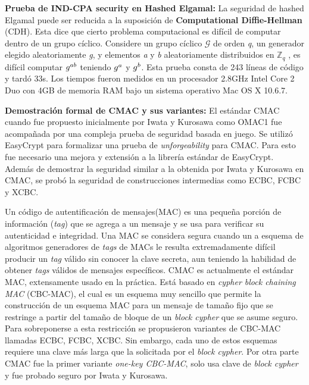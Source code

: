 \documentclass[runningheads]{llncs}
\begin{document}
\textbf{Prueba de \textbf{IND-CPA security} en Hashed Elgamal\cite{ref_article5}:}
La seguridad de hashed Elgamal puede ser reducida a la suposición de \textbf{Computational Diffie-Hellman} (CDH). Esta dice que cierto problema computacional es difícil de computar dentro de un grupo cíclico. Considere un grupo cíclico $\mathcal{G}$ de orden \textit{q}, un generador elegido aleatoriamente \textit{g}, y elementos \textit{a} y \textit{b} aleatoriamente distribuidos en $\mathbb{Z}_q$ , es difícil computar $\mathnormal{g^{ab}}$ teniendo $\mathnormal{g^{a}}$ y $\mathnormal{g^{b}}$. Esta prueba consta de 243 líneas de código y tardó 33s. Los tiempos fueron medidos en un procesador 2.8GHz Intel Core 2 Duo con 4GB de memoria RAM bajo un sistema operativo Mac OS X 10.6.7.



\textbf{Demostración formal de CMAC y sus variantes\cite{ref_article6}:}
El estándar CMAC cuando fue propuesto inicialmente por Iwata y Kurosawa como OMAC1 fue acompañada por una compleja prueba de seguridad basada en juego. Se utilizó EasyCrypt para formalizar una prueba de \textit{unforgeability} para CMAC. Para esto fue necesario una mejora y extensión a la librería estándar de EasyCrypt. Además de demostrar la seguridad similar a la obtenida por Iwata y Kurosawa\cite{ref_article7} en CMAC, se probó la seguridad de construcciones intermedias como ECBC, FCBC y XCBC\cite{ref_article8}.

Un código de autentificación de mensajes(MAC) es una pequeña porción de información (\textit{tag}) que se agrega a un mensaje y se usa para verificar su autenticidad e integridad. Una MAC se considera segura cuando un a esquema de algoritmos generadores de \textit{tags} de MACs le resulta extremadamente difícil producir un \textit{tag} válido sin conocer la clave secreta, aun teniendo la habilidad de obtener \textit{tags} válidos de mensajes específicos. CMAC es actualmente el estándar MAC, extensamente usado en la práctica. Está basado en \textit{cypher block chaining MAC} (CBC-MAC), el cual es un esquema muy sencillo que permite la construcción de un esquema MAC para un mensaje de tamaño fijo que se restringe a partir del tamaño de bloque de un \textit{block cypher} que se asume seguro. Para sobreponerse a esta restricción se propusieron variantes de CBC-MAC llamadas ECBC, FCBC, XCBC. Sin embargo, cada uno de estos esquemas requiere una clave más larga que la solicitada por el \textit{block cypher}. Por otra parte CMAC fue la primer variante \textit{one-key CBC-MAC}, solo usa clave de \textit{block cypher} y fue probado seguro por Iwata y Kurosawa.
\end{document}
